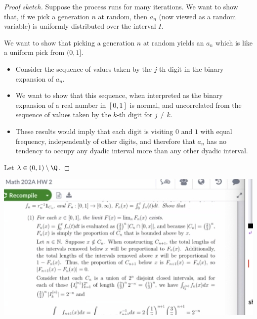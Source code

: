 \begin{enumerate}[label=(5.\arabic*)]
  \begin{proof}[Proof sketch]
    Suppose the process runs for many iterations. We want to show that, if we pick a generation $n$ at random,
    then $a_n$ (now viewed as a random variable) is uniformly distributed over the interval $I$.

    We want to show that picking a generation $n$ at random yields an $a_n$ which is like a uniform pick
    from $(0, 1]$.

    \begin{itemize}
    \item Consider the sequence of values taken by the $j$-th digit in the binary expansion of $a_n$.
    \item We want to show that this sequence, when interpreted as the binary expansion of a real number in
      $[0, 1]$ is normal, and uncorrelated from the sequence of values taken by the $k$-th digit for $j \neq k$.
    \item These results would imply that each digit is visiting $0$ and $1$ with equal frequency, independently of
      other digits, and therefore that $a_n$ has no tendency to occupy any dyadic interval more than any other
      dyadic interval.
    \end{itemize}

    Let $\lambda \in (0, 1) \setminus \Q$.


  \end{proof}
\end{enumerate}



\begin{mdframed}
\includegraphics[width=400pt]{img/analysis--berkeley-202a-hw-ad0a.png}
\end{mdframed}

